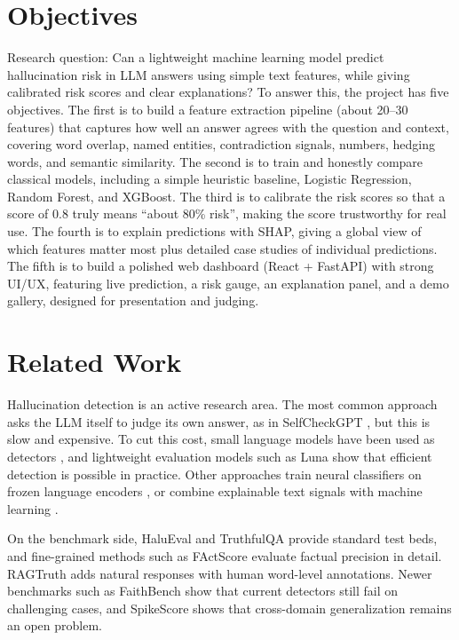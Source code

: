 \documentclass[12pt,a4paper]{article}
\begin{document}
\section{Objectives}

Research question: Can a lightweight machine learning model predict hallucination risk in LLM answers using simple text features, while giving calibrated risk scores and clear explanations? To answer this, the project has five objectives. The first is to build a feature extraction pipeline (about 20--30 features) that captures how well an answer agrees with the question and context, covering word overlap, named entities, contradiction signals, numbers, hedging words, and semantic similarity. The second is to train and honestly compare classical models, including a simple heuristic baseline, Logistic Regression, Random Forest, and XGBoost. The third is to calibrate the risk scores so that a score of 0.8 truly means ``about 80\% risk'', making the score trustworthy for real use. The fourth is to explain predictions with SHAP, giving a global view of which features matter most plus detailed case studies of individual predictions. The fifth is to build a polished web dashboard (React + FastAPI) with strong UI/UX, featuring live prediction, a risk gauge, an explanation panel, and a demo gallery, designed for presentation and judging.

\section{Related Work}

Hallucination detection is an active research area. The most common approach asks the LLM itself to judge its own answer, as in SelfCheckGPT \cite{selfcheck}, but this is slow and expensive. To cut this cost, small language models have been used as detectors \cite{haluagent}, and lightweight evaluation models such as Luna \cite{luna} show that efficient detection is possible in practice. Other approaches train neural classifiers on frozen language encoders \cite{ieeeTai}, or combine explainable text signals with machine learning \cite{ijert,multimedia}.

On the benchmark side, HaluEval \cite{haluEval} and TruthfulQA \cite{truthqa} provide standard test beds, and fine-grained methods such as FActScore \cite{factscore} evaluate factual precision in detail. RAGTruth \cite{ragtruth} adds natural responses with human word-level annotations. Newer benchmarks such as FaithBench \cite{faithbench} show that current detectors still fail on challenging cases, and SpikeScore \cite{spikescore} shows that cross-domain generalization remains an open problem.
\end{document}

